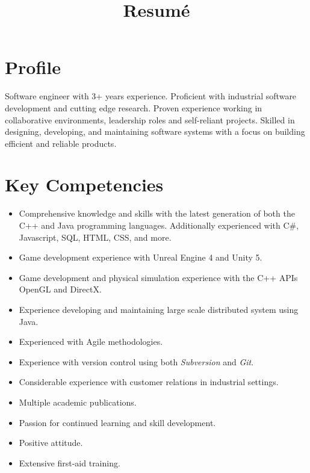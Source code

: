 \documentclass[11pt,a4paper,sans]{moderncv}        %
\title{Resumé}                               %
\begin{document}
\makecvtitle
\section{Profile}
Software engineer with 3+ years experience. 
Proficient with industrial software development and cutting edge research.
Proven experience working in collaborative environments, leadership roles and self-reliant projects.
Skilled in designing, developing, and maintaining software systems with a focus on building efficient and reliable products.
\section{Key Competencies}
\begin{itemize}
	\item Comprehensive knowledge and skills with the latest generation of both the C++ and Java programming languages. Additionally experienced with C\#, Javascript, SQL, HTML, CSS, and more.
	\item Game development experience with Unreal Engine 4 and Unity 5.
	\item Game development and physical simulation experience with the C++ APIs OpenGL and DirectX.
	\item Experience developing and maintaining large scale distributed system using Java.
	\item Experienced with Agile methodologies.
	\item Experience with version control using both \textit{Subversion} and \textit{Git}.
	\item Considerable experience with customer relations in industrial settings.
	\item Multiple academic publications.
	\item Passion for continued learning and skill development.
	\item Positive attitude.
	\item Extensive first-aid training.
\end{itemize}
\end{document}
